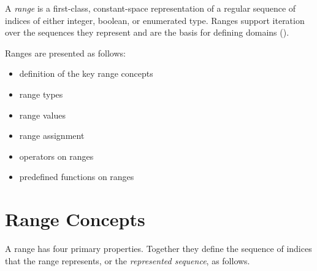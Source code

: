 \label{Ranges}

A \emph{range} is a first-class, constant-space representation of a
regular sequence of indices of either integer, boolean, or enumerated
type.  Ranges support iteration over the sequences they represent and
are the basis for defining domains ().

Ranges are presented as follows:
\begin{itemize}
\item definition of the key range concepts 
\item range types 
\item range values 
\item range assignment 
\item operators on ranges 
\item predefined functions on ranges 
\end{itemize}


\section{Range Concepts}
\label{Range_Concepts}

A range has four primary properties. Together they define the sequence
of indices that the range represents, or the \emph{represented sequence},
as follows.

